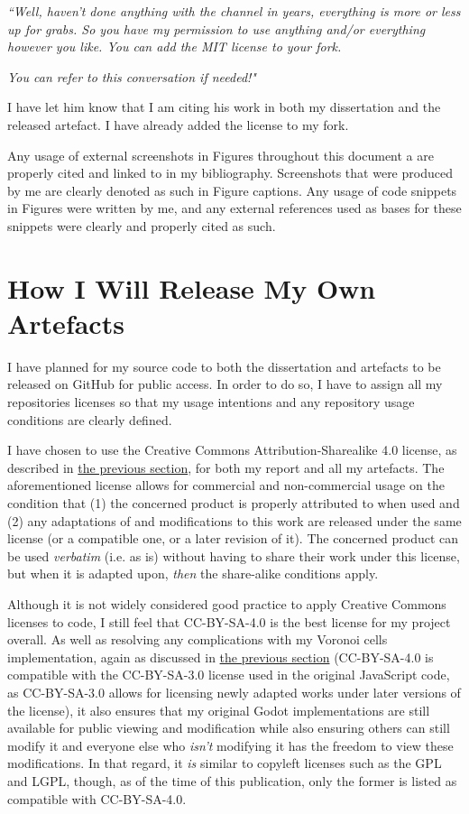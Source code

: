 \textit{``Well, haven't done anything with the channel in years, everything is more or less up for grabs. So you have my permission to use anything and/or everything however you like. You can add the MIT license to your fork.}

\textit{You can refer to this conversation if needed!"}

I have let him know that I am citing his work in both my dissertation and the released artefact. I have already added the license to my fork.\cite{codatGD4LSystemGH}

Any usage of external screenshots in Figures throughout this document a are properly cited and linked to in my bibliography. Screenshots that were produced by me are clearly denoted as such in Figure captions. Any usage of code snippets in Figures were written by me, and any external references used as bases for these snippets were clearly and properly cited as such.

\section{How I Will Release My Own Artefacts} \label{howrelease}

I have planned for my source code to both the dissertation and artefacts to be released on GitHub for public access. In order to do so, I have to assign all my repositories licenses so that my usage intentions and any repository usage conditions are clearly defined. 

I have chosen to use the Creative Commons Attribution-Sharealike 4.0 license, as described in \hyperref[howuse]{the previous section}, for both my report and all my artefacts. The aforementioned license allows for commercial and non-commercial usage on the condition that (1) the concerned product is properly attributed to when used and (2) any adaptations of and modifications to this work are released under the same license (or a compatible one, or a later revision of it).\cite{cc_at_sa_4} The concerned product can be used \textit{verbatim} (i.e. as is) without having to share their work under this license, but when it is adapted upon, \textit{then} the share-alike conditions apply.

Although it is not widely considered good practice to apply Creative Commons licenses to code\cite{cc_faq_code}, I still feel that CC-BY-SA-4.0 is the best license for my project overall. As well as resolving any complications with my Voronoi cells implementation, again as discussed in \hyperref[howuse]{the previous section} (CC-BY-SA-4.0 is compatible with the CC-BY-SA-3.0 license used in the original JavaScript code, as CC-BY-SA-3.0 allows for licensing newly adapted works under later versions of the license\cite{cc_compat}), it also ensures that my original Godot implementations are still available for public viewing and modification while also ensuring others can still modify it and everyone else who \textit{isn't} modifying it has the freedom to view these modifications. In that regard, it \textit{is} similar to copyleft licenses such as the GPL and LGPL, though, as of the time of this publication, only the former is listed as compatible with CC-BY-SA-4.0.\cite{cc_compat}

